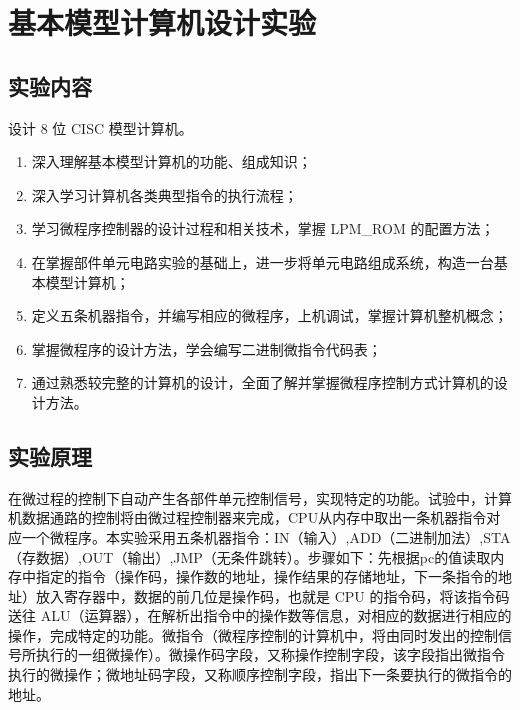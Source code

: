 \chapter{基本模型计算机设计实验}

\section{实验内容}

设计 8 位 CISC 模型计算机。

\begin{enumerate}
    
    \item 深入理解基本模型计算机的功能、组成知识；

    \item 深入学习计算机各类典型指令的执行流程；

    \item 学习微程序控制器的设计过程和相关技术，掌握 LPM\_ROM 的配置方法；

    \item 在掌握部件单元电路实验的基础上，进一步将单元电路组成系统，构造一台基本模型计算机；

    \item 定义五条机器指令，并编写相应的微程序，上机调试，掌握计算机整机概念；
    
    \item 掌握微程序的设计方法，学会编写二进制微指令代码表；

    \item 通过熟悉较完整的计算机的设计，全面了解并掌握微程序控制方式计算机的设计方法。

\end{enumerate}

\section{实验原理}

在微过程的控制下自动产生各部件单元控制信号，实现特定的功能。试验中，计算机数据通路的控制将由微过程控制器来完成，CPU从内存中取出一条机器指令对应一个微程序。本实验采用五条机器指令：IN（输入）,ADD（二进制加法）,STA（存数据）,OUT（输出）,JMP（无条件跳转）。步骤如下：先根据pc的值读取内存中指定的指令（操作码，操作数的地址，操作结果的存储地址，下一条指令的地址）放入寄存器中，数据的前几位是操作码，也就是 CPU 的指令码，将该指令码送往 ALU（运算器），在解析出指令中的操作数等信息，对相应的数据进行相应的操作，完成特定的功能。微指令（微程序控制的计算机中，将由同时发出的控制信号所执行的一组微操作）。微操作码字段，又称操作控制字段，该字段指出微指令执行的微操作；微地址码字段，又称顺序控制字段，指出下一条要执行的微指令的地址。

